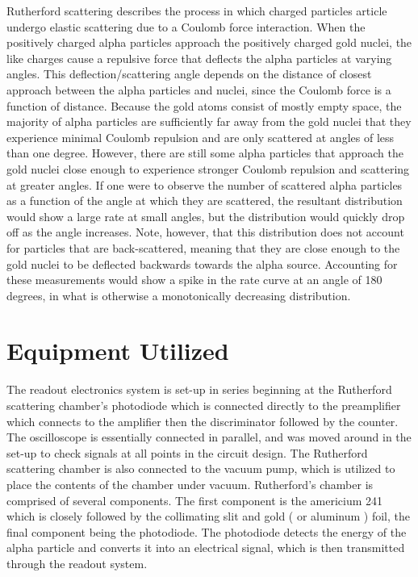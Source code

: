 \documentclass[a4paper]{article}
\begin{document}
\qq Rutherford scattering describes the process in which charged particles article undergo elastic scattering due to a Coulomb force interaction. When the positively charged
alpha particles approach the positively charged gold nuclei, the like charges cause a repulsive force that deflects the alpha particles at varying angles. This deflection/scattering angle depends on the distance of closest approach between the alpha particles and nuclei, since the Coulomb force is a function of distance. Because the gold atoms consist of mostly empty space, the majority of alpha particles are sufficiently far away from the gold nuclei that they experience minimal Coulomb repulsion and are only scattered at angles of less than one degree. However, there are still some alpha particles that approach the gold nuclei close enough to experience stronger Coulomb repulsion and scattering at greater angles. If one were to observe the number of scattered alpha particles as a function of the angle at which they are scattered, the resultant distribution would show a large rate at small angles, but the distribution would quickly drop off as the angle increases. Note, however, that this distribution does not account for particles that are back-scattered, meaning that they are close enough to the gold nuclei to be deflected backwards towards the alpha source. Accounting for these measurements would show a spike in the rate curve at an angle of 180 degrees, in what is otherwise a monotonically decreasing distribution. 

\qq 

\qq 

\section{Equipment Utilized}

\qq The readout electronics system is set-up in series beginning at
the Rutherford scattering chamber's photodiode which is connected
directly to the preamplifier which connects to the amplifier then the
discriminator followed by the counter. The oscilloscope is essentially
connected in parallel, and was moved around in the set-up to check
signals at all points in the circuit design. The Rutherford scattering
chamber is also connected to the vacuum pump, which is utilized to
place the contents of the chamber under vacuum. Rutherford's chamber
is comprised of several components. The first component is the
americium 241 which is closely followed by the collimating slit and
gold ( or aluminum ) foil, the final component being the
photodiode. The photodiode detects the energy of the alpha particle
and converts it into an electrical signal, which is then transmitted
through the readout system.
\end{document}

